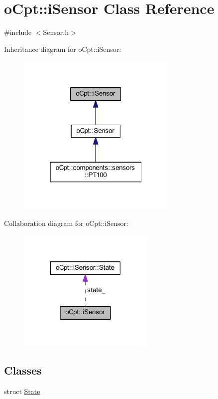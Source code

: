 \hypertarget{classo_cpt_1_1i_sensor}{}\section{o\+Cpt\+:\+:i\+Sensor Class Reference}
\label{classo_cpt_1_1i_sensor}


{\ttfamily \#include $<$Sensor.\+h$>$}



Inheritance diagram for o\+Cpt\+:\+:i\+Sensor\+:
\nopagebreak
\begin{figure}[H]
\begin{center}
\leavevmode
\includegraphics[width=217pt]{classo_cpt_1_1i_sensor__inherit__graph}
\end{center}
\end{figure}


Collaboration diagram for o\+Cpt\+:\+:i\+Sensor\+:
\nopagebreak
\begin{figure}[H]
\begin{center}
\leavevmode
\includegraphics[width=185pt]{classo_cpt_1_1i_sensor__coll__graph}
\end{center}
\end{figure}
\subsection*{Classes}
\begin{DoxyCompactItemize}
\item 
struct \hyperlink{structo_cpt_1_1i_sensor_1_1_state}{State}
\end{DoxyCompactItemize}
